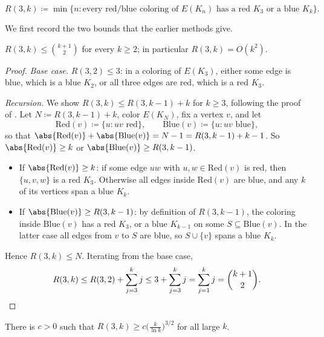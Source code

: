 \begin{definition}\label{def:r3k}
    \[
        R(3,k) \coloneqq \min \{ n : \text{every red/blue coloring of } E(K_{n}) \text{ has a red } K_{3} \text{ or a blue } K_{k} \} .
    \]
\end{definition}

We first record the two bounds that the earlier methods give.

\begin{proposition}\label{prop:r3k-upper}
    \(R(3,k) \le \binom{k+1}{2}\) for every \(k \ge 2\); in particular \(R(3,k) = O(k^{2})\).
\end{proposition}

\begin{proof}
    \emph{Base case.} \(R(3,2) \le 3\): in a coloring of \(E(K_{3})\), either some edge is blue, which is a blue \(K_{2}\), or all three edges are red, which is a red \(K_{3}\).

    \emph{Recursion.} We show \(R(3,k) \le R(3,k-1) + k\) for \(k \ge 3\), following the proof of . Let \(N \coloneqq R(3,k-1) + k\), color \(E(K_{N})\), fix a vertex \(v\), and let
    \[
        \mathrm{Red}(v) \coloneqq \{ u : uv \text{ red} \}, \qquad
        \mathrm{Blue}(v) \coloneqq \{ u : uv \text{ blue} \},
    \]
    so that \(\abs{\mathrm{Red}(v)} + \abs{\mathrm{Blue}(v)} = N - 1 = R(3,k-1) + k - 1\).
    So \(\abs{\mathrm{Red}(v)} \ge k\) or \(\abs{\mathrm{Blue}(v)} \ge R(3,k-1)\).
    \begin{itemize}
        \item If \(\abs{\mathrm{Red}(v)} \ge k\): if some edge \(uw\) with \(u, w \in \mathrm{Red}(v)\) is red, then \(\{u, v, w\}\) is a red \(K_{3}\). Otherwise all edges inside \(\mathrm{Red}(v)\) are blue, and any \(k\) of its vertices span a blue \(K_{k}\).
        \item If \(\abs{\mathrm{Blue}(v)} \ge R(3,k-1)\): by definition of \(R(3,k-1)\), the coloring inside \(\mathrm{Blue}(v)\) has a red \(K_{3}\), or a blue \(K_{k-1}\) on some \(S \subseteq \mathrm{Blue}(v)\). In the latter case all edges from \(v\) to \(S\) are blue, so \(S \cup \{v\}\) spans a blue \(K_{k}\).
    \end{itemize}
    Hence \(R(3,k) \le N\). Iterating from the base case,
    \[
        R(3,k) \le R(3,2) + \sum_{j=3}^{k} j \le 3 + \sum_{j=3}^{k} j = \sum_{j=1}^{k} j = \binom{k+1}{2} . \qedhere
    \]
\end{proof}

\begin{proposition}\label{prop:r3k-alteration}
    There is \(c > 0\) such that \(R(3,k) \ge c \bigl( \frac{k}{\ln k} \bigr)^{3/2}\) for all large \(k\).
\end{proposition}

